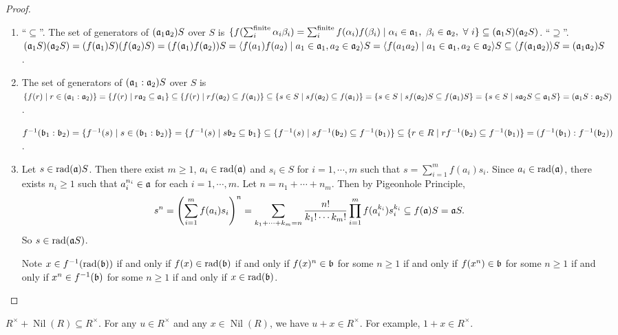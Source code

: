 \begin{proof}
\begin{enumerate}
        \item 
            ``$\subseteq$''. The set of generators of $(\mathfrak{a}_1\mathfrak{a}_2)S$ over $S$ is $\{f(\sum_i^{\text{finite}}\alpha_i\beta_i) = \sum_i^{\text{finite}} f(\alpha_i)f(\beta_i) \mid \alpha_i \in \mathfrak{a}_1,\ \beta_i \in \mathfrak{a}_2, \ \forall \  i\} \subseteq (\mathfrak{a}_1S)(\mathfrak{a}_2S)$. ``$\supseteq$''. $(\mathfrak{a}_1S)(\mathfrak{a}_2S) = (f(\mathfrak{a}_1)S)(f(\mathfrak{a}_2)S) = (f(\mathfrak{a}_1)f(\mathfrak{a}_2))S = \langle f(a_1)f(a_2) \mid a_1 \in \mathfrak{a}_1,a_2 \in \mathfrak{a}_2 \rangle S = \langle f(a_1a_2) \mid a_1 \in \mathfrak{a}_1,a_2 \in \mathfrak{a}_2 \rangle S \subseteq \langle f(\mathfrak{a}_1\mathfrak{a}_2) \rangle S = (\mathfrak{a}_1\mathfrak{a}_2)S$. 
        \item 
            The set of generators of $(\mathfrak{a}_1:\mathfrak{a}_2)S$ over $S$ is $\{f(r) \mid r \in (\mathfrak{a}_1:\mathfrak{a}_2)\} = \{f(r) \mid r \mathfrak{a}_2 \subseteq \mathfrak{a}_1\} \subseteq \{f(r) \mid r f(\mathfrak{a}_2) \subseteq f(\mathfrak{a}_1)\} \subseteq \{s \in S \mid sf(\mathfrak{a}_2) \subseteq f(\mathfrak{a}_1)\} = \{s \in S \mid s f(\mathfrak{a}_2)S \subseteq f(\mathfrak{a}_1)S \} = \{s \in S \mid s \mathfrak{a}_2 S \subseteq \mathfrak{a}_1 S\} = (\mathfrak{a}_1S:\mathfrak{a}_2S)$. \par
            $f^{-1}(\mathfrak{b}_1:\mathfrak{b}_2) = \{f^{-1}(s) \mid s \in (\mathfrak{b}_1:\mathfrak{b}_2)\} = \{f^{-1}(s) \mid s\mathfrak{b}_2 \subseteq \mathfrak{b}_1\} \subseteq \{f^{-1}(s) \mid sf^{-1}(\mathfrak{b}_2) \subseteq f^{-1}(\mathfrak{b}_1)\} \subseteq \{r \in R\mid rf^{-1}(\mathfrak{b}_2) \subseteq f^{-1}(\mathfrak{b}_1)\} = (f^{-1}(\mathfrak{b}_1):f^{-1}(\mathfrak{b}_2))$.
        \item 
            Let $s \in \operatorname{rad}(\mathfrak{a})S$. Then there exist $m \geq 1$, $a_i \in \operatorname{rad}(\mathfrak{a})$ and $s_i \in S$ for $i = 1,\cdots,m$ such that $s = \sum_{i=1}^m f(a_i)s_i$. Since $a_i \in \operatorname{rad}(\mathfrak{a})$, there exists $n_i \geq 1$ such that $a_i^{n_i} \in \mathfrak{a}$ for each $i = 1,\cdots,m$. Let $n = n_1 + \cdots + n_m$. Then by Pigeonhole Principle, 
            \[s^n = \left(\sum_{i=1}^m f(a_i)s_i\right)^n = \sum_{k_1 + \cdots + k_m = n} \frac{n!}{k_1! \cdots k_m!} \prod_{i=1}^m f(a_i^{k_i})s_i^{k_i} \subseteq f(\mathfrak{a})S = \mathfrak{a} S.\]
            So $s \in \operatorname{rad}(\mathfrak{a} S)$. \par
            Note $x \in f^{-1}(\operatorname{rad}(\mathfrak{b}))$ if and only if $f(x) \in \operatorname{rad}(\mathfrak{b})$ if and only if $f(x)^n \in \mathfrak{b}$ for some $n \geq 1$ if and only if $f(x^n) \in \mathfrak{b}$ for some $n \geq 1$ if and only if $x^n  \in f^{-1}(\mathfrak{b})$ for some $n \geq 1$ if and only if $x \in \operatorname{rad}(\mathfrak{b})$. \qedhere
    \end{enumerate}
\end{proof}

\begin{proposition}
    $R^\times + \operatorname{Nil}(R) \subseteq R^\times$. For any $u \in R^\times$ and any $x \in \operatorname{Nil}(R)$, we have $u+x \in R^\times$. For example, $1+x \in R^\times$.
\end{proposition}

